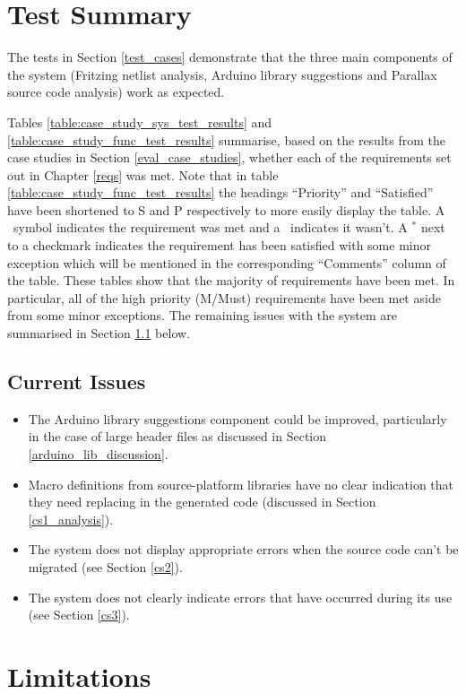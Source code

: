 \documentclass{UoYCSproject}
\newcommand{\xmark}{\ding{55}}%
\renewcommand{\checkmark}{\ding{51}}
\begin{document}
\section{Test Summary} \label{test_summary}
The tests in Section \ref{test_cases} demonstrate that the three main components of the system (Fritzing netlist analysis, Arduino library suggestions and Parallax source code analysis) work as expected.

Tables \ref{table:case_study_sys_test_results} and \ref{table:case_study_func_test_results} summarise, based on the results from the case studies in Section \ref{eval_case_studies}, whether each of the requirements set out in Chapter \ref{reqs} was met. Note that in table \ref{table:case_study_func_test_results} the headings ``Priority'' and ``Satisfied'' have been shortened to S and P respectively to more easily display the table. A \checkmark \ symbol indicates the requirement was met and a \xmark \ indicates it wasn't. A $^*$ next to a checkmark indicates the requirement has been satisfied with some minor exception which will be mentioned in the corresponding ``Comments'' column of the table.
These tables show that the majority of requirements have been met. In particular, all of the high priority (M/Must) requirements have been met aside from some minor exceptions. The remaining issues with the system are summarised in Section \ref{current_issues} below.

\subsection{Current Issues} \label{current_issues}
\begin{itemize}
\item The Arduino library suggestions component could be improved, particularly in the case of large header files as discussed in Section \ref{arduino_lib_discussion}.
\item Macro definitions from source-platform libraries have no clear indication that they need replacing in the generated code (discussed in Section \ref{cs1_analysis}).
\item The system does not display appropriate errors when the source code can't be migrated (see Section \ref{cs2}).
\item The system does not clearly indicate errors that have occurred during its use (see Section \ref{cs3}).
\end{itemize}

\section{Limitations} \label{eval_limits}
\end{document}
